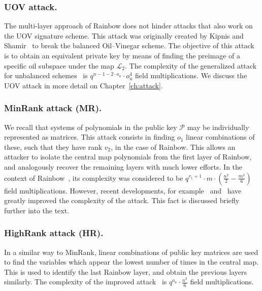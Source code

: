 \documentclass[12pt, a4paper, oneside]{memoir}
\theoremstyle{definition}
\begin{document}
\subsubsection{UOV attack.} 

The multi-layer approach of Rainbow does not hinder attacks that also work on the UOV signature scheme. This attack was originally created by Kipnis and Shamir~\cite{Kipnis:199808} to break the balanced Oil--Vinegar scheme. The objective of this attack is to obtain an equivalent private key by means of finding the preimage of a specific oil subspace under the map $\mathcal{L}_{2}$. The complexity of the generalized attack for unbalanced schemes~\cite{Kipnis:199904} is $q^{n - 1 - 2 \cdot o_{u}} \cdot o_{u}^{4}$ field multiplications. We discuss the UOV attack in more detail on Chapter~\ref{ch:attack}.

\subsubsection{MinRank attack (MR).} 

We recall that systems of polynomials in the public key $\mathcal{P}$ may be individually represented as matrices. This attack consists in finding $o_{1}$ linear combinations of these, such that they have rank $v_{2}$, in the case of Rainbow. This allows an attacker to isolate the central map polynomials from the first layer of Rainbow, and analogously recover the remaining layers with much lower efforts. In the context of Rainbow~\cite{Billet:200609,Faugere:200808}, its complexity was considered to be $q^{v_{1} + 1} \cdot m \cdot (\frac{n^{2}}{2} - \frac{m^{2}}{6})$ field multiplications. However, recent developments, for example~\cite[Table 3]{Bardet:202006} and~\cite{Nakamura:202007b} have greatly improved the complexity of the attack. This fact is discussed briefly further into the text.

\subsubsection{HighRank attack (HR).} 

In a similar way to MinRank, linear combinations of public key matrices are used to find the variables which appear the lowest number of times in the central map. This is used to identify the last Rainbow layer, and obtain the previous layers similarly. The complexity of the improved attack~\cite{Ding:200806} is $q^{o_{u}} \cdot \frac{n^{3}}{6}$ field multiplications.
\end{document}
